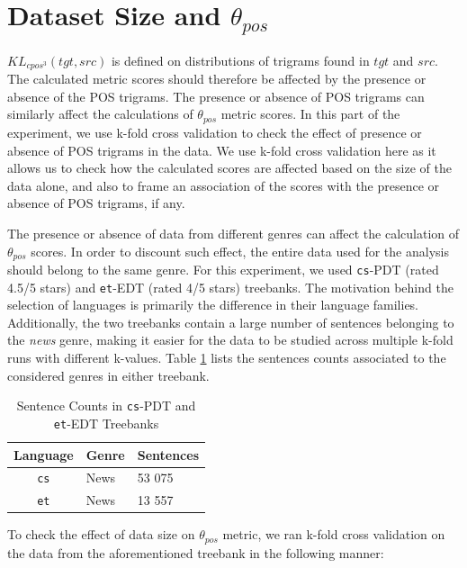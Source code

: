 \section{Dataset Size and \texorpdfstring{$\theta_{pos}$}{theta\_pos}}
\label{sec:pos-harmony-size}

$KL_{cpos^{3}}(tgt, src)$ is defined on distributions of trigrams found in $tgt$ and $src$. The calculated metric scores should therefore be affected by the presence or absence of the POS trigrams. The presence or absence of POS trigrams can similarly affect the calculations of $\theta_{pos}$ metric scores. In this part of the experiment, we use k-fold cross validation to check the effect of presence or absence of POS trigrams in the data. We use k-fold cross validation here as it allows us to check how the calculated scores are affected based on the size of the data alone, and also to frame an association of the scores with the presence or absence of POS trigrams, if any. 

The presence or absence of data from different genres can affect the calculation of $\theta_{pos}$ scores. In order to discount such effect, the entire data used for the analysis should belong to the same genre. For this experiment, we used \verb|cs|-PDT (rated 4.5/5 stars) and \verb|et|-EDT (rated 4/5 stars) treebanks. The motivation behind the selection of languages is primarily the difference in their language families. Additionally, the two treebanks contain a large number of sentences belonging to the \textit{news} genre, making it easier for the data to be studied across multiple k-fold runs with different k-values. Table \ref{tab:pos-harmony-size-datasize} lists the sentences counts associated to the considered genres in either treebank.

\begin{table}[H]
    \centering
    \begin{tabular}{|c|l|l|}
        \hline
        \textbf{Language} & \textbf{Genre} & \textbf{Sentences}\\
        \hline
        \texttt{cs} & News & 53 075 \\
        \hline
        \texttt{et} & News & 13 557 \\
        \hline
    \end{tabular}
    \caption{Sentence Counts in \texttt{cs}-PDT and \texttt{et}-EDT Treebanks}
    \label{tab:pos-harmony-size-datasize}
\end{table}


To check the effect of data size on $\theta_{pos}$ metric, we ran k-fold cross validation on the data from the aforementioned treebank in the following manner:

